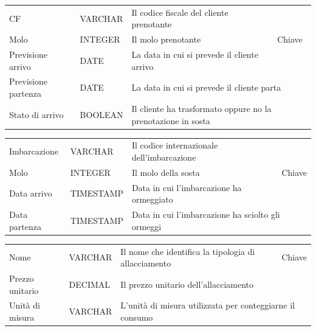 \begin{center}
    \begin{tabularx}{\textwidth}{|l|l|l|X|}
        \hline
        \rowcolor{gray!30}
        \multicolumn{4}{|c|}{\textbf{Prenotazione}}\\
        \hline
        CF & VARCHAR & Il codice fiscale del cliente prenotante & \multirow{3}{*}{Chiave}\\
        \hhline{---}
        Molo & INTEGER & Il molo prenotante &\\
        \hhline{---}
        Previsione arrivo & DATE & La data in cui si prevede il cliente arrivo &\\
        \hline
        Previsione partenza & DATE & \multicolumn{2}{l|}{La data in cui si prevede il cliente parta}\\
        \hline
        Stato di arrivo & BOOLEAN & \multicolumn{2}{l|}{Il cliente ha trasformato oppure no la prenotazione in sosta}\\
        \hline
    \end{tabularx}
\end{center}

\begin{center}
    \begin{tabularx}{\textwidth}{|l|l|l|X|}
        \hline
        \rowcolor{gray!30}
        \multicolumn{4}{|c|}{\textbf{Sosta}}\\
        \hline
        Imbarcazione & VARCHAR & Il codice internazionale dell'imbarcazione & \multirow{3}{*}{Chiave}\\
        \hhline{---}
        Molo & INTEGER & Il molo della sosta &\\
        \hhline{---}
        Data arrivo & TIMESTAMP & Data in cui l'imbarcazione ha ormeggiato & \\
        \hline
        Data partenza & TIMESTAMP & \multicolumn{2}{l|}{Data in cui l'imbarcazione ha sciolto gli ormeggi} \\
        \hline
    \end{tabularx}
\end{center}

\begin{center}
    \begin{tabularx}{\textwidth}{|l|l|l|X|}
        \hline
        \rowcolor{gray!30}
        \multicolumn{4}{|c|}{\textbf{Allacciamento}}\\
        \hline
        Nome & VARCHAR & Il nome che identifica la tipologia di allacciamento &Chiave\\
        \hline
        Prezzo unitario & DECIMAL & \multicolumn{2}{l|}{Il prezzo unitario dell'allacciamento}\\
        \hline
        Unità di misura & VARCHAR & \multicolumn{2}{l|}{L'unità di misura utilizzata per conteggiarne il consumo}\\
        \hline
    \end{tabularx}
\end{center}

